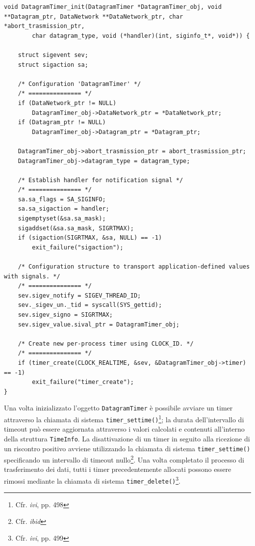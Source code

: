 \documentclass[10pt,a4paper, titlepage]{report}
\begin{document}
\begin{lstlisting}[frame=lines, caption={Implementazione della funzione \texttt{DatagramTimer\_init}}, label={code:DatagramTimerInit}]
void DatagramTimer_init(DatagramTimer *DatagramTimer_obj, void **Datagram_ptr, DataNetwork **DataNetwork_ptr, char *abort_trasmission_ptr,
		char datagram_type, void (*handler)(int, siginfo_t*, void*)) {

	struct sigevent sev;
	struct sigaction sa;

	/* Configuration 'DatagramTimer' */
	/* =============== */
	if (DataNetwork_ptr != NULL)
		DatagramTimer_obj->DataNetwork_ptr = *DataNetwork_ptr;
	if (Datagram_ptr != NULL)
		DatagramTimer_obj->Datagram_ptr = *Datagram_ptr;

	DatagramTimer_obj->abort_trasmission_ptr = abort_trasmission_ptr;
	DatagramTimer_obj->datagram_type = datagram_type;

	/* Establish handler for notification signal */
	/* =============== */
	sa.sa_flags = SA_SIGINFO;
	sa.sa_sigaction = handler;
	sigemptyset(&sa.sa_mask);
	sigaddset(&sa.sa_mask, SIGRTMAX);
	if (sigaction(SIGRTMAX, &sa, NULL) == -1)
		exit_failure("sigaction");

	/* Configuration structure to transport application-defined values with signals. */
	/* =============== */
	sev.sigev_notify = SIGEV_THREAD_ID;
	sev._sigev_un._tid = syscall(SYS_gettid);
	sev.sigev_signo = SIGRTMAX;
	sev.sigev_value.sival_ptr = DatagramTimer_obj;

	/* Create new per-process timer using CLOCK_ID. */
	/* =============== */
	if (timer_create(CLOCK_REALTIME, &sev, &DatagramTimer_obj->timer) == -1)
		exit_failure("timer_create");
}
\end{lstlisting}

Una volta inizializzato l'oggetto \texttt{DatagramTimer} è possibile avviare un timer attraverso la chiamata di sistema \texttt{timer\_settime()}\footnote{Cfr. \textit{ivi}, pp. 498}; la durata dell'intervallo di timeout può essere aggiornata attraverso i valori calcolati e contenuti all'interno della struttura \texttt{TimeInfo}. La disattivazione di un timer in seguito alla ricezione di un riscontro positivo avviene utilizzando la chiamata di sistema \texttt{timer\_settime()} specificando un intervallo di timeout nullo\footnote{Cfr. \textit{ibid}}.
Una volta completato il processo di trasferimento dei dati, tutti i timer precedentemente allocati possono essere rimossi mediante la chiamata di sistema \texttt{timer\_delete()}\footnote{Cfr. \textit{ivi}, pp. 499}. 
\end{document}
